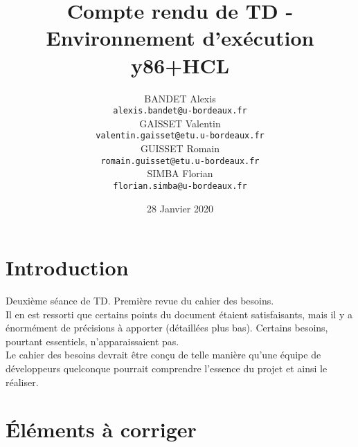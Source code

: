 \documentclass[french]{article}
\title{Compte rendu de TD - Environnement d'exécution y86+HCL}
\author{
    BANDET Alexis \\
    \texttt{alexis.bandet@u-bordeaux.fr} \\
    GAISSET Valentin \\
    \texttt{valentin.gaisset@etu.u-bordeaux.fr} \\
    GUISSET Romain \\
    \texttt{romain.guisset@etu.u-bordeaux.fr} \\
    SIMBA Florian \\
    \texttt{florian.simba@u-bordeaux.fr} \\
}
\date{28 Janvier 2020}
\begin{document}
\maketitle
\newpage
\tableofcontents
\newpage

\section{Introduction}

Deuxième séance de TD. Première revue du cahier des besoins.\\
Il en est ressorti que certains points du document étaient satisfaisants, mais il y a énormément de précisions à apporter (détaillées plus bas). Certains besoins, pourtant essentiels, n'apparaissaient pas.
\\
Le cahier des besoins devrait être conçu de telle manière qu'une équipe de développeurs quelconque pourrait comprendre l'essence du projet et ainsi le réaliser.

\section{Éléments à corriger}
\end{document}
